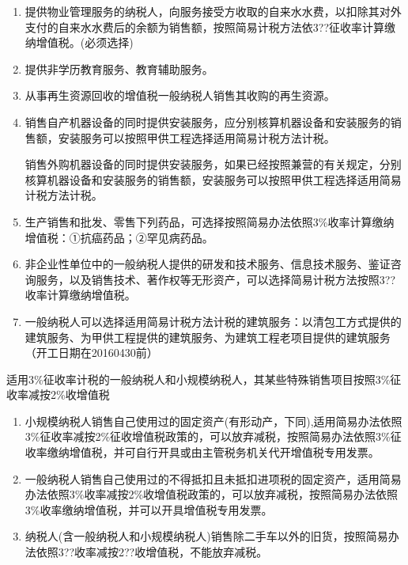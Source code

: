 \documentclass[UTF8,12pt]{ctexart}
\numberwithin{equation}{section} %
\numberwithin{figure}{section}
\numberwithin{table}{section}
\begin{document}
\begin{enumerate}
		\item 提供物业管理服务的纳税人，向服务接受方收取的自来水水费，以扣除其对外支付的自来水水费后的余额为销售额，按照简易计税方法依3??征收率计算缴纳增值税。(必须选择)
		
		\item 提供非学历教育服务、教育辅助服务。
		
		\item 从事再生资源回收的增值税一般纳税人销售其收购的再生资源。
		
		\item 销售自产机器设备的同时提供安装服务，应分别核算机器设备和安装服务的销售额，安装服务可以按照甲供工程选择适用简易计税方法计税。
		
		销售外购机器设备的同时提供安装服务，如果已经按照兼营的有关规定，分别核算机器设备和安装服务的销售额，安装服务可以按照甲供工程选择适用简易计税方法计税。
		
		\item 生产销售和批发、零售下列药品，可选择按照简易办法依照3\%收率计算缴纳增值税：①抗癌药品；②罕见病药品。
		
		\item 非企业性单位中的一般纳税人提供的研发和技术服务、信息技术服务、鉴证咨询服务，以及销售技术、著作权等无形资产，可以选择简易计税方法按照3??收率计算缴纳增值税。
		
		\item 一般纳税人可以选择适用简易计税方法计税的建筑服务：以清包工方式提供的建筑服务、为甲供工程提供的建筑服务、为建筑工程老项目提供的建筑服务（开工日期在20160430前）
	\end{enumerate}
	
	适用3\%征收率计税的一般纳税人和小规模纳税人，其某些特殊销售项目按照3\%征收率减按2\%收增值税
	\begin{enumerate}
		\item 小规模纳税人销售自己使用过的固定资产(有形动产，下同),适用简易办法依照3\%征收率减按2\%征收增值税政策的，可以放弃减税，按照简易办法依照3\%征收率缴纳增值税，并可自行开具或由主管税务机关代开增值税专用发票。
		
		\item 一般纳税人销售自己使用过的不得抵扣且未抵扣进项税的固定资产，适用简易办法依照3\%收率减按2\%收增值税政策的，可以放弃减税，按照简易办法依照3\%收率缴纳增值税，并可以开具增值税专用发票。
		
		\item 纳税人(含一般纳税人和小规模纳税人)销售除二手车以外的旧货，按照简易办法依照3??收率减按2??收增值税，不能放弃减税。
	\end{enumerate}
	
\end{document}
